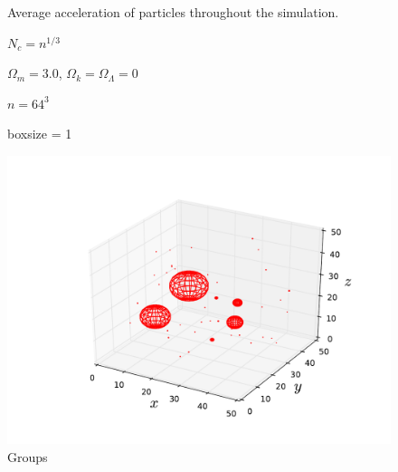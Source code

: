 \documentclass[10pt]{article}
\begin{document}
\begin{figure}[htbp]
\centering

\label{fig:accel}
\caption{Average acceleration of particles throughout the simulation.}
\end{figure}

\begin{figure}[htbp]
\centering

\caption{$N_c = n^{1/3}$}
\label{fig:1ncells}
\end{figure}

\begin{figure}[htbp]
\centering

\caption{$\Omega_m = 3.0$, $\Omega_k = \Omega_\Lambda = 0$}
\label{fig:3mass}
\end{figure}

\begin{figure}[htbp]
\centering

\caption{$n = 64^3$}
\label{fig:n64}
\end{figure}

\begin{figure}[htbp]
\centering

\caption{boxsize = 1}
\label{fig:1boxsize}
\end{figure}

\begin{figure}[htbp]
\centering
\includegraphics{Control_Groups.pdf}
\caption{Groups}
\label{fig:groups}
\end{figure}
\end{document}
